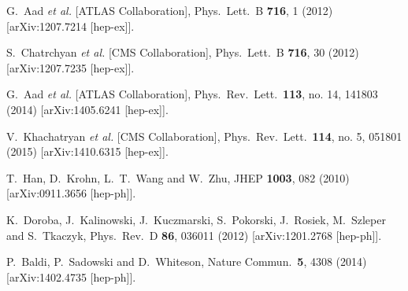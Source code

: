   G.~Aad {\it et al.}  [ATLAS Collaboration],
  Phys.\ Lett.\ B {\bf 716}, 1 (2012)
  [arXiv:1207.7214 [hep-ex]].


  S.~Chatrchyan {\it et al.}  [CMS Collaboration],
  Phys.\ Lett.\ B {\bf 716}, 30 (2012)
  [arXiv:1207.7235 [hep-ex]].

  G.~Aad {\it et al.}  [ATLAS Collaboration],
  Phys.\ Rev.\ Lett.\  {\bf 113}, no. 14, 141803 (2014)
  [arXiv:1405.6241 [hep-ex]].


  V.~Khachatryan {\it et al.}  [CMS Collaboration],
  Phys.\ Rev.\ Lett.\  {\bf 114}, no. 5, 051801 (2015)
  [arXiv:1410.6315 [hep-ex]].


  T.~Han, D.~Krohn, L.~T.~Wang and W.~Zhu,
  JHEP {\bf 1003}, 082 (2010)
  [arXiv:0911.3656 [hep-ph]].

  K.~Doroba, J.~Kalinowski, J.~Kuczmarski, S.~Pokorski, J.~Rosiek, M.~Szleper and S.~Tkaczyk,
  Phys.\ Rev.\ D {\bf 86}, 036011 (2012)
  [arXiv:1201.2768 [hep-ph]].

  P.~Baldi, P.~Sadowski and D.~Whiteson,
  Nature Commun.\  {\bf 5}, 4308 (2014)
  [arXiv:1402.4735 [hep-ph]].

